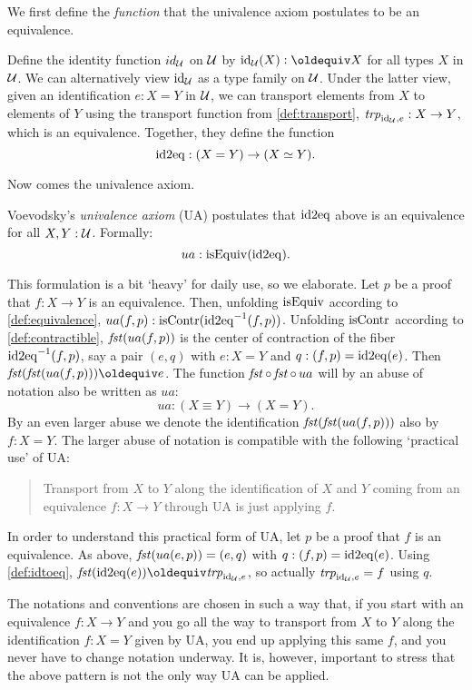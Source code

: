 We first define the \emph{function} that
the univalence axiom postulates to be an equivalence.

\begin{definition}\label{def:idtoeq}
Define the identity function $id_{\mathcal{U}}$ on $\mathcal{U}$ by $\id_\UU(X)\defeq X$ 
for all types $X$ in $\mathcal{U}$.
We can alternatively view $\mathord{\mathrm{id}}_{\mathcal{U}}$ as a type family on $\mathcal{U}$. 
Under the latter view,
given an identification $e : X = Y$ in $\mathcal{U}$, we can
transport elements from $X$ to elements of $Y$ using the transport
function from \cref{def:transport},
$\mathord{\mathit{trp}}_{\mathord{\mathrm{id}}_{\mathcal{U}}, e} : X \to Y$, which is an equivalence. 
Together, they define the function
\[
\mathrm{id2eq} : (X = Y) \to (X\simeq Y).
\]
\end{definition}

Now comes the univalence axiom.

\begin{definition}\label{def:univalence}
Voevodsky's \emph{univalence axiom} (UA) postulates that 
$\mathrm{id2eq}$ above is an equivalence for all $X,Y:\mathcal{U}$.
Formally: \[ ua : \mathrm{isEquiv}(\mathrm{id2eq}).\]
\end{definition}

This formulation is a bit `heavy' for daily use,
so we elaborate.
Let $p$ be a proof that $f: X\to Y$ is an equivalence.
Then, unfolding $\mathrm{isEquiv}$ according to \cref{def:equivalence}, 
$ua(f,p): \mathrm{isContr}(\mathrm{id2eq}^{-1}(f,p))$.
Unfolding $\mathrm{isContr}$ according to \cref{def:contractible}, 
$\mathop{\mathit{fst}}(ua(f,p))$ is the center of contraction 
of the fiber $\mathrm{id2eq}^{-1}(f,p)$,
say a pair $(e,q)$ with $e:X=Y$ and $q: (f,p) = \mathrm{id2eq}(e)$.
Then $\fst(\fst(ua(f,p)))\jdeq e$. 
The function $\mathop{\mathit{fst}}\circ\mathop{\mathit{fst}}\circ {\,ua}$ will
by an abuse of notation also be written as $ua$:
\[
ua : (X \equiv Y) \to (X=Y). 
\]
By an even larger abuse we denote the identification
$\mathop{\mathit{fst}}(\mathop{\mathit{fst}}(ua(f,p)))$ also by $f: X=Y$. 
The larger abuse of notation is compatible with the following
`practical use' of UA: 
\begin{quote}
Transport from $X$ to $Y$ along the identification of $X$ and $Y$
coming from an equivalence $f : X\to Y$ through UA is just applying $f$.
\end{quote}
In order to understand this practical form of UA,
let $p$ be a proof that $f$ is an equivalence.
As above, $\mathop{\mathit{fst}}(ua(e,p)) = (e,q)$ with $q: (f,p) = \mathrm{id2eq}(e)$.
Using \cref{def:idtoeq}, $\fst(\idtoeq(e))\jdeq\trp_{\id_\UU, e}$,
so actually $\mathord{\mathit{trp}}_{\mathord{\mathrm{id}}_{\mathcal{U}}, e} =f$ using $q$.

The notations and conventions are chosen in such a way that,
if you start with an equivalence $f : X\to Y$ and you go all 
the way to transport from $X$ to $Y$ along the identification
$f: X=Y$ given by UA, you end up applying this same $f$, 
and you never have to change notation underway. 
It is, however, important to stress that the above pattern is
not the only way UA can be applied.

